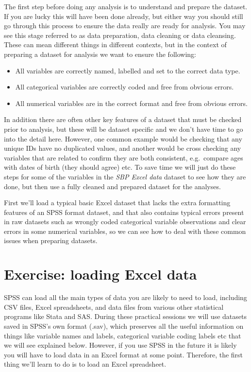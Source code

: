 \documentclass[
]{book}
\begin{document}
The first step before doing any analysis is to understand and prepare the dataset. If you are lucky this will have been done already, but either way you should still go through this process to ensure the data really are ready for analysis. You may see this stage referred to as data preparation, data cleaning or data cleansing. These can mean different things in different contexts, but in the context of preparing a dataset for analysis we want to ensure the following:

\begin{itemize}
\item
  All variables are correctly named, labelled and set to the correct data type.
\item
  All categorical variables are correctly coded and free from obvious errors.
\item
  All numerical variables are in the correct format and free from obvious errors.
\end{itemize}

In addition there are often other key features of a dataset that must be checked prior to analysis, but these will be dataset specific and we don't have time to go into the detail here. However, one common example would be checking that any unique IDs have no duplicated values, and another would be cross checking any variables that are related to confirm they are both consistent, e.g.~compare ages with dates of birth (they should agree) etc. To save time we will just do these steps for some of the variables in the \emph{SBP Excel data} dataset to see how they are done, but then use a fully cleaned and prepared dataset for the analyses.

First we'll load a typical basic Excel dataset that lacks the extra formatting features of an SPSS format dataset, and that also contains typical errors present in raw datasets such as wrongly coded categorical variable observations and clear errors in some numerical variables, so we can see how to deal with these common issues when preparing datasets.

\hypertarget{exercise-loading-excel-data}{%
\section{Exercise: loading Excel data}\label{exercise-loading-excel-data}}

SPSS can load all the main types of data you are likely to need to load, including CSV files, Excel spreadsheets, and data files from various other statistical programs like Stata and SAS. During these practical sessions we will use datasets saved in SPSS's own format (.sav), which preserves all the useful information on things like variable names and labels, categorical variable coding labels etc that we will see explained below. However, if you use SPSS in the future it is likely you will have to load data in an Excel format at some point. Therefore, the first thing we'll learn to do is to load an Excel spreadsheet.
\end{document}
